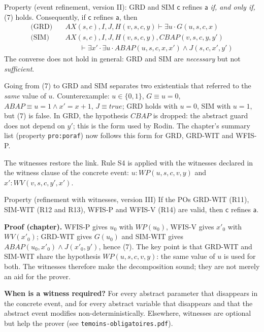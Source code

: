 \documentclass[11pt,a4paper]{article}
\newcommand{\AX}{\mathit{AX}(s,c)}
\newcommand{\sff}[1]{\textsf{#1}}
\newcommand{\po}[1]{\textsf{\small #1}}
\newcommand{\champ}[1]{\par\smallskip\noindent\textbf{#1}\enspace}
\begin{document}
\begin{regle}{Property (event refinement, version II): GRD and SIM}
  $\mathsf{c}$ refines $\mathsf{a}$ \emph{if, and only if,} (7) holds. Consequently,
  if $\mathsf{c}$ refines $\mathsf{a}$, then
  \begin{align*}
    \text{(GRD)}\quad & \AX, I, J, H(v,s,c,y) \vdash \exists u\cdot G(u,s,c,x)\\
    \text{(SIM)}\quad & \AX, I, J, H(v,s,c,y), \mathit{CBAP}(v,s,c,y,y')\\
      & \qquad \vdash \exists x'\cdot\exists u\cdot \mathit{ABAP}(u,s,c,x,x')\wedge J(s,c,x',y')
  \end{align*}
  The converse does not hold in general: GRD and SIM are \emph{necessary} but not
  \emph{sufficient}.
\end{regle}
Going from (7) to GRD and SIM separates two existentials that referred to the
\emph{same} value of $u$. Counterexample: $u\in\{0,1\}$, $G\equiv u=0$,
$\mathit{ABAP}\equiv u=1\wedge x'=x+1$, $J\equiv\mathit{true}$; GRD holds with
$u=0$, SIM with $u=1$, but (7) is false. In GRD, the hypothesis $\mathit{CBAP}$ is
dropped: the abstract guard does not depend on $y'$; this is the form used by
Rodin. The chapter's summary list (property \texttt{pro:poraf}) now
follows this form for \po{GRD}, \po{GRD-WIT} and \po{WFIS-P}.

The witnesses restore the link. Rule S4 is applied with the witnesses declared in
the \sff{witness} clause of the concrete event: $u : \mathit{WP}(u,s,c,v,y)$ and
$x' : \mathit{WV}(v,s,c,y',x')$.

\begin{regle}{Property (refinement with witnesses, version III)}
  If the POs \po{GRD-WIT} (R11), \po{SIM-WIT} (R12 and R13), \po{WFIS-P} and
  \po{WFIS-V} (R14) are valid, then $\mathsf{c}$ refines $\mathsf{a}$.
  \champ{Proof (chapter).} \po{WFIS-P} gives $u_0$ with $\mathit{WP}(u_0)$,
  \po{WFIS-V} gives $x'_0$ with $\mathit{WV}(x'_0)$; \po{GRD-WIT} gives $G(u_0)$
  and \po{SIM-WIT} gives $\mathit{ABAP}(u_0,x'_0)\wedge J(x'_0,y')$, hence (7). The
  key point is that \po{GRD-WIT} and \po{SIM-WIT} share the hypothesis
  $\mathit{WP}(u,s,c,v,y)$: the same value of $u$ is used for both. The witnesses
  therefore make the decomposition sound; they are not merely an aid for the
  prover.
\end{regle}
\textbf{When is a witness required?} For every abstract parameter that disappears
in the concrete event, and for every abstract variable that disappears and that the
abstract event modifies non-deterministically. Elsewhere, witnesses are optional
but help the prover (see \texttt{temoins-obligatoires.pdf}).
\end{document}
